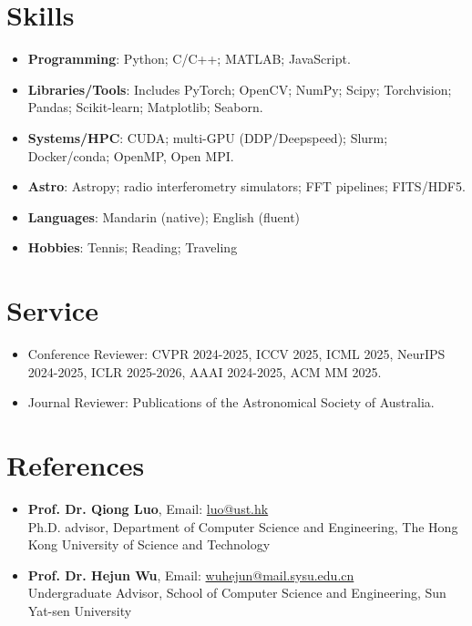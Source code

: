 \documentclass[letterpaper,10pt]{article}
\begin{document}
\begin{CJK}{UTF8}{gbsn}
\section{\Large{Skills}}
 \begin{itemize}
    \item{
     \textbf{Programming}{: Python; C/C++; MATLAB; JavaScript.} 
     }
     \item{
     \textbf{Libraries/Tools}{: Includes PyTorch; OpenCV; NumPy; Scipy; Torchvision; Pandas; Scikit-learn; Matplotlib; Seaborn.}
     }\\
     \item{\textbf{Systems/HPC}{: CUDA; multi-GPU (DDP/Deepspeed); Slurm; Docker/conda; OpenMP, Open MPI.\\}}
     \item{\textbf{Astro}: Astropy; radio interferometry simulators; FFT pipelines; FITS/HDF5.}
     \item{
     \textbf{Languages}{: Mandarin (native); English (fluent)}
     }
     \item{
     \textbf{Hobbies}{: Tennis; Reading; Traveling}
     }
 \end{itemize}

\section{\Large{Service}}
\begin{itemize}
    \item Conference Reviewer: CVPR 2024-2025, ICCV 2025, ICML 2025, NeurIPS 2024-2025, ICLR 2025-2026, AAAI 2024-2025, ACM MM 2025.
    \item Journal Reviewer: Publications of the Astronomical Society of Australia.
\end{itemize}

\section{\Large{References}}
\begin{itemize}
    \item \textbf{Prof. Dr. Qiong Luo},  Email: \href{mailto:{luo@ust.hk}}{luo@ust.hk}\\
    Ph.D. advisor, Department of Computer Science and Engineering, The Hong Kong University of Science and Technology 
    
    \item \textbf{Prof. Dr. Hejun Wu}, Email: \href{mailto:{wuhejun@mail.sysu.edu.cn}}{wuhejun@mail.sysu.edu.cn}  \\
    Undergraduate Advisor, School of Computer Science and Engineering, Sun Yat-sen University \\
    


\end{itemize}
\end{CJK}
\end{document}
